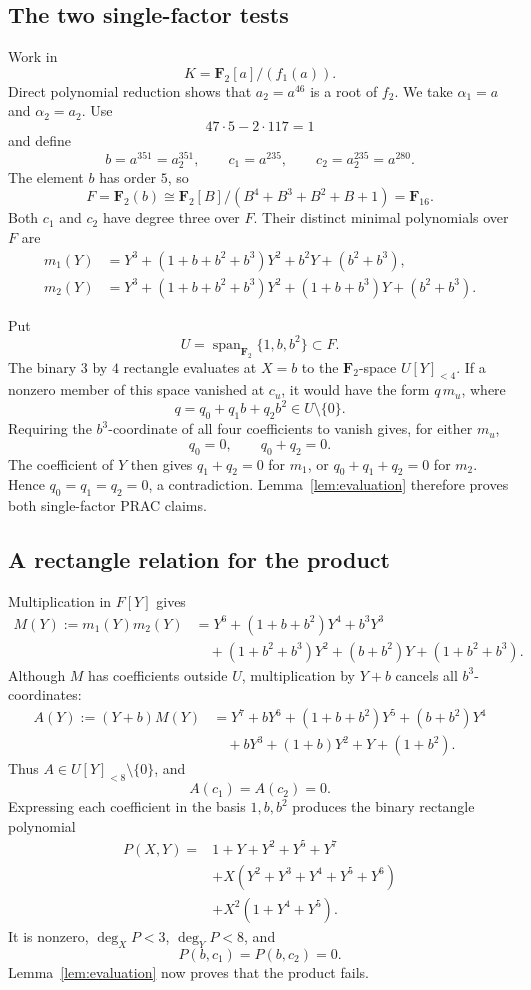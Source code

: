 \documentclass[11pt]{article}
\newcommand{\F}{\mathbf F}
\begin{document}
\subsection{The two single-factor tests}

Work in
\[
 K=\F_2[a]/(f_1(a)).
\]
Direct polynomial reduction shows that \(a_2=a^{46}\) is a root of \(f_2\).
We take \(\alpha_1=a\) and \(\alpha_2=a_2\).
Use
\[
 47\cdot5-2\cdot117=1
\]
and define
\[
 b=a^{351}=a_2^{351},\qquad
 c_1=a^{235},\qquad c_2=a_2^{235}=a^{280}.
\]
The element \(b\) has order \(5\), so
\[
 F=\F_2(b)\cong
 \F_2[B]/(B^4+B^3+B^2+B+1)=\F_{16}.
\]
Both \(c_1\) and \(c_2\) have degree three over \(F\).  Their distinct
minimal polynomials over \(F\) are
\[
\begin{aligned}
 m_1(Y)&=Y^3+(1+b+b^2+b^3)Y^2+b^2Y+(b^2+b^3),\\
 m_2(Y)&=Y^3+(1+b+b^2+b^3)Y^2
              +(1+b+b^3)Y+(b^2+b^3).
\end{aligned}
\]

Put
\[
 U=\operatorname{span}_{\F_2}\{1,b,b^2\}\subset F.
\]
The binary \(3\) by \(4\) rectangle evaluates at \(X=b\) to the
\(\F_2\)-space \(U[Y]_{<4}\).
If a nonzero member of this space vanished at \(c_u\), it would have the
form \(q\,m_u\), where
\[
 q=q_0+q_1b+q_2b^2\in U\setminus\{0\}.
\]
Requiring the \(b^3\)-coordinate of all four coefficients to vanish gives,
for either \(m_u\),
\[
 q_0=0,\qquad q_0+q_2=0.
\]
The coefficient of \(Y\) then gives \(q_1+q_2=0\) for \(m_1\), or
\(q_0+q_1+q_2=0\) for \(m_2\).  Hence \(q_0=q_1=q_2=0\), a contradiction.
Lemma~\ref{lem:evaluation} therefore proves both single-factor PRAC claims.

\subsection{A rectangle relation for the product}

Multiplication in \(F[Y]\) gives
\[
\begin{aligned}
 M(Y):=m_1(Y)m_2(Y)
 &=Y^6+(1+b+b^2)Y^4+b^3Y^3\\
 &\quad +(1+b^2+b^3)Y^2+(b+b^2)Y+(1+b^2+b^3).
\end{aligned}
\]
Although \(M\) has coefficients outside \(U\), multiplication by \(Y+b\)
cancels all \(b^3\)-coordinates:
\[
\begin{aligned}
 A(Y):=(Y+b)M(Y)
 &=Y^7+bY^6+(1+b+b^2)Y^5+(b+b^2)Y^4\\
 &\quad+bY^3+(1+b)Y^2+Y+(1+b^2).
\end{aligned}
\]
Thus \(A\in U[Y]_{<8}\setminus\{0\}\), and
\[
 A(c_1)=A(c_2)=0.
\]
Expressing each coefficient in the basis \(1,b,b^2\) produces the binary
rectangle polynomial
\[
\boxed{
\begin{aligned}
P(X,Y)={}&1+Y+Y^2+Y^5+Y^7\\
 &+X(Y^2+Y^3+Y^4+Y^5+Y^6)\\
 &+X^2(1+Y^4+Y^5).
\end{aligned}}
\]
It is nonzero, \(\deg_XP<3\), \(\deg_YP<8\), and
\[
 P(b,c_1)=P(b,c_2)=0.
\]
Lemma~\ref{lem:evaluation} now proves that the product fails.
\end{document}
